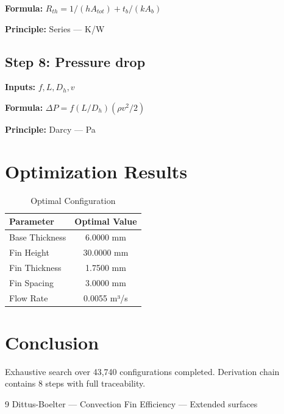 \documentclass[11pt,twocolumn]{article}
\begin{document}
\textbf{Formula:} $R_{th} = 1/(h A_{tot}) + t_b/(k A_b)$

\textbf{Principle:} Series --- K/W

\subsection*{Step 8: Pressure drop}
\textbf{Inputs:} $f, L, D_h, v$

\textbf{Formula:} $\Delta P = f (L/D_h) (\rho v^2/2)$

\textbf{Principle:} Darcy --- Pa


\section{Optimization Results}
\begin{table}[h]
\centering
\caption{Optimal Configuration}
\begin{tabular}{@{}lc@{}}
\toprule
Parameter & Optimal Value \\
\midrule
Base Thickness & 6.0000 mm \\
Fin Height & 30.0000 mm \\
Fin Thickness & 1.7500 mm \\
Fin Spacing & 3.0000 mm \\
Flow Rate & 0.0055 m³/s \\
\bottomrule
\end{tabular}
\end{table}

\section{Conclusion}
Exhaustive search over 43,740 configurations completed.
Derivation chain contains 8 steps with full traceability.

\begin{thebibliography}{9}
 Dittus-Boelter --- Convection
 Fin Efficiency --- Extended surfaces
\end{thebibliography}
\end{document}
